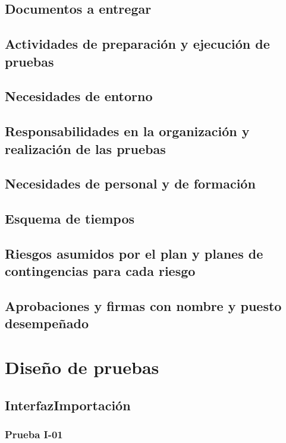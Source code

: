 \documentclass[10pt,a4paper]{article}
\begin{document}
	\subsection{Documentos a entregar}

	\subsection{Actividades de preparación y ejecución de pruebas}

	\subsection{Necesidades de entorno}

	\subsection{Responsabilidades en la organización y realización de las pruebas}

	\subsection{Necesidades de personal y de formación}

	\subsection{Esquema de tiempos}

	\subsection{Riesgos asumidos por el plan y planes de contingencias para cada riesgo}

	\subsection{Aprobaciones y firmas con nombre y puesto desempeñado}

\section{Diseño de pruebas}
	\subsection{InterfazImportación}
			\subsubsection{Prueba I-01}
\end{document}
